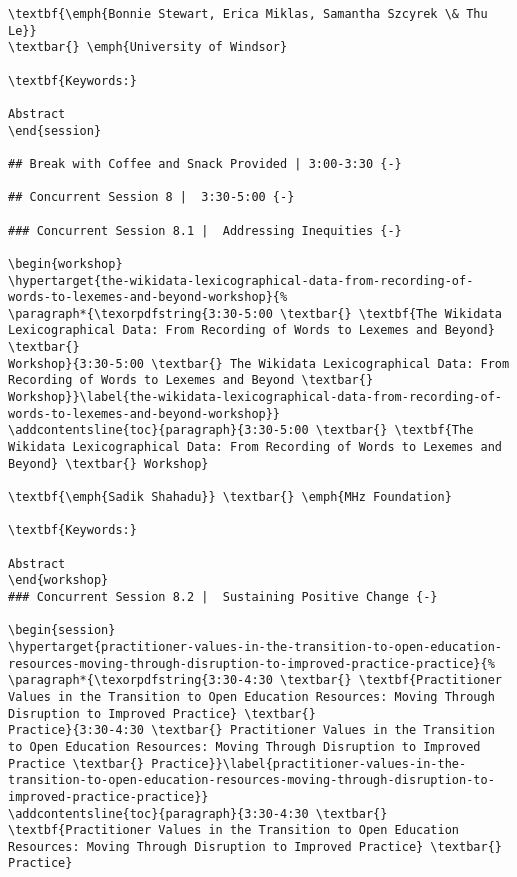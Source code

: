 \documentclass[
]{book}
\begin{document}
\begin{verbatim}
\textbf{\emph{Bonnie Stewart, Erica Miklas, Samantha Szcyrek \& Thu Le}}
\textbar{} \emph{University of Windsor}

\textbf{Keywords:}

Abstract
\end{session}

## Break with Coffee and Snack Provided | 3:00-3:30 {-}

## Concurrent Session 8 |  3:30-5:00 {-}

### Concurrent Session 8.1 |  Addressing Inequities {-}

\begin{workshop}
\hypertarget{the-wikidata-lexicographical-data-from-recording-of-words-to-lexemes-and-beyond-workshop}{%
\paragraph*{\texorpdfstring{3:30-5:00 \textbar{} \textbf{The Wikidata
Lexicographical Data: From Recording of Words to Lexemes and Beyond}
\textbar{}
Workshop}{3:30-5:00 \textbar{} The Wikidata Lexicographical Data: From Recording of Words to Lexemes and Beyond \textbar{} Workshop}}\label{the-wikidata-lexicographical-data-from-recording-of-words-to-lexemes-and-beyond-workshop}}
\addcontentsline{toc}{paragraph}{3:30-5:00 \textbar{} \textbf{The
Wikidata Lexicographical Data: From Recording of Words to Lexemes and
Beyond} \textbar{} Workshop}

\textbf{\emph{Sadik Shahadu}} \textbar{} \emph{MHz Foundation}

\textbf{Keywords:}

Abstract
\end{workshop}
### Concurrent Session 8.2 |  Sustaining Positive Change {-}

\begin{session}
\hypertarget{practitioner-values-in-the-transition-to-open-education-resources-moving-through-disruption-to-improved-practice-practice}{%
\paragraph*{\texorpdfstring{3:30-4:30 \textbar{} \textbf{Practitioner
Values in the Transition to Open Education Resources: Moving Through
Disruption to Improved Practice} \textbar{}
Practice}{3:30-4:30 \textbar{} Practitioner Values in the Transition to Open Education Resources: Moving Through Disruption to Improved Practice \textbar{} Practice}}\label{practitioner-values-in-the-transition-to-open-education-resources-moving-through-disruption-to-improved-practice-practice}}
\addcontentsline{toc}{paragraph}{3:30-4:30 \textbar{}
\textbf{Practitioner Values in the Transition to Open Education
Resources: Moving Through Disruption to Improved Practice} \textbar{}
Practice}


\end{verbatim}
\end{document}
